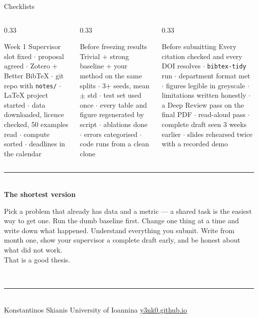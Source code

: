 \documentclass[aspectratio=169,11pt]{beamer}
\newcommand{\code}[1]{\texttt{\small #1}}
\newcommand{\lnk}[2]{\href{#1}{\color{brandlight}\underline{#2}}}
\begin{document}
\begin{frame}{Checklists}
\begin{columns}[T]
\begin{column}{0.33\textwidth}
\begin{block}{Week 1}
\scriptsize
Supervisor slot fixed $\cdot$ proposal agreed $\cdot$ Zotero + Better BibTeX
$\cdot$ git repo with \code{notes/} $\cdot$ LaTeX project started $\cdot$ data
downloaded, licence checked, 50 examples read $\cdot$ compute sorted $\cdot$
deadlines in the calendar
\end{block}
\end{column}
\begin{column}{0.33\textwidth}
\begin{block}{Before freezing results}
\scriptsize
Trivial + strong baseline + your method on the same splits $\cdot$ 3+ seeds,
mean $\pm$ std $\cdot$ test set used once $\cdot$ every table and figure
regenerated by script $\cdot$ ablations done $\cdot$ errors categorised $\cdot$
code runs from a clean clone
\end{block}
\end{column}
\begin{column}{0.33\textwidth}
\begin{block}{Before submitting}
\scriptsize
Every citation checked and every DOI resolves $\cdot$ \code{bibtex-tidy} run
$\cdot$ department format met
$\cdot$ figures legible in greyscale $\cdot$ limitations written honestly $\cdot$ a Deep Review pass on the final PDF
$\cdot$ read-aloud pass $\cdot$ complete draft seen 3 weeks earlier $\cdot$
slides rehearsed twice with a recorded demo
\end{block}
\end{column}
\end{columns}
\end{frame}

\begin{frame}
\vfill
\centering
{\color{brandlight}\rule{0.8\textwidth}{1.4pt}}\\[10pt]
{\large\bfseries\color{brand}The shortest version}\\[10pt]
\begin{minipage}{0.82\textwidth}\centering
Pick a problem that already has data and a metric --- a shared task is the
easiest way to get one. Run the dumb baseline first. Change one thing at a time
and write down what happened. Understand everything you submit. Write from
month one, show your supervisor a complete draft early, and be honest about
what did not work.\\[6pt]
That is a good thesis.
\end{minipage}\\[12pt]
{\color{brandlight}\rule{0.8\textwidth}{1.4pt}}\\[14pt]
{\footnotesize\color{mutegray}Konstantinos Skianis \quad\textbullet\quad
University of Ioannina \quad\textbullet\quad
\lnk{https://y3nk0.github.io}{y3nk0.github.io}}
\vfill
\end{frame}
\end{document}
